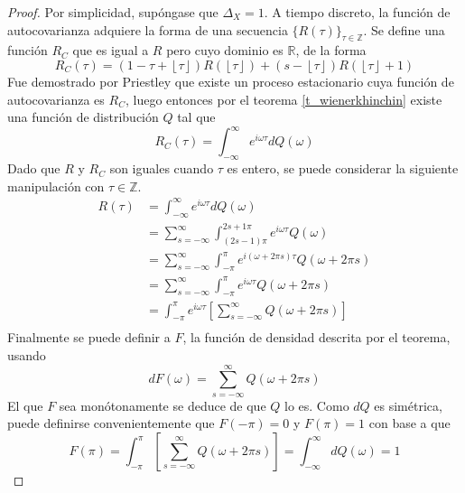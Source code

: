 \documentclass[12pt,letterpaper]{book}
\newcommand{\R}{\mathbb{R}}
\newcommand{\Z}{\mathbb{Z}}
\newcommand{\intR}{\int_{-\infty}^{\infty}}
\newcommand{\intPI}{\int_{-\pi}^{\pi}}
\newcommand{\entero}[1]{\left\lfloor #1 \right\rfloor}
\begin{document}
\begin{proof}
Por simplicidad, supóngase que $\Delta_X=1$. A tiempo discreto, la función de autocovarianza adquiere la forma de una secuencia $\{R(\tau)\}_{\tau\in \Z}$. Se define una función $R_C$ que es igual a $R$ pero cuyo dominio es $\R$, de la forma
\begin{equation}
R_C(\tau) = \left( 1 - \tau + \entero{\tau} \right) R\left( \entero{\tau} \right) +
\left( s - \entero{\tau} \right) R\left( \entero{\tau} +1 \right)
\end{equation}
Fue demostrado por Priestley \cite{Priestley81} que existe un proceso estacionario cuya función de autocovarianza es $R_C$, luego entonces por el teorema \ref{t_wienerkhinchin} existe una función de distribución $Q$ tal que 
\begin{equation}
R_C(\tau) = \intR e^{i \omega \tau} dQ(\omega)
\end{equation}
Dado que $R$ y $R_C$ son iguales cuando $\tau$ es entero, se puede considerar la siguiente manipulación con $\tau \in \Z$.
\begin{align*}
R(\tau) &= 
\intR e^{i \omega \tau} dQ(\omega) \\
&=
\sum_{s = -\infty}^{\infty} \int_{(2s-1)\pi}^{2s+1 \pi} e^{i \omega \tau} Q(\omega) \\
&=
\sum_{s = -\infty}^{\infty} \int_{-\pi}^{\pi} e^{i \left(\omega + 2\pi s \right) \tau} Q(\omega + 2 \pi s) \\
&=
\sum_{s = -\infty}^{\infty} \int_{-\pi}^{\pi} e^{i \omega \tau} Q(\omega + 2 \pi s) \\
&=
\int_{-\pi}^{\pi} e^{i \omega \tau} \left[ \sum_{s = -\infty}^{\infty} Q(\omega + 2 \pi s) \right] \\
\end{align*}
Finalmente se puede definir a $F$, la función de densidad descrita por el teorema, usando
\begin{equation}
dF(\omega) = \sum_{s = -\infty}^{\infty} Q(\omega + 2 \pi s)
\end{equation}
El que $F$ sea monótonamente se deduce de que $Q$ lo es. Como $dQ$ es simétrica, puede definirse convenientemente que $F(-\pi)=0$ y $F(\pi) = 1$ con base a que
\begin{equation}
F(\pi) = \intPI \left[ \sum_{s = -\infty}^{\infty} Q(\omega + 2 \pi s) \right] = \intR dQ(\omega) = 1
\end{equation}
\end{proof}

\end{document}

